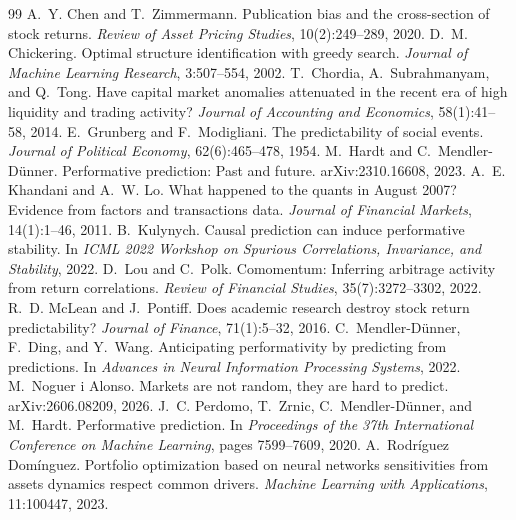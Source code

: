 \documentclass[11pt]{article}
\theoremstyle{plain}
\theoremstyle{definition}
\begin{document}
\begin{thebibliography}{99}
 A.~Y. Chen and T.~Zimmermann. Publication bias and the cross-section of stock returns. \emph{Review of Asset Pricing Studies}, 10(2):249--289, 2020.
 D.~M. Chickering. Optimal structure identification with greedy search. \emph{Journal of Machine Learning Research}, 3:507--554, 2002.
 T.~Chordia, A.~Subrahmanyam, and Q.~Tong. Have capital market anomalies attenuated in the recent era of high liquidity and trading activity? \emph{Journal of Accounting and Economics}, 58(1):41--58, 2014.
 E.~Grunberg and F.~Modigliani. The predictability of social events. \emph{Journal of Political Economy}, 62(6):465--478, 1954.
 M.~Hardt and C.~Mendler-D\"unner. Performative prediction: Past and future. arXiv:2310.16608, 2023.
 A.~E. Khandani and A.~W. Lo. What happened to the quants in August 2007? Evidence from factors and transactions data. \emph{Journal of Financial Markets}, 14(1):1--46, 2011.
 B.~Kulynych. Causal prediction can induce performative stability. In \emph{ICML 2022 Workshop on Spurious Correlations, Invariance, and Stability}, 2022.
 D.~Lou and C.~Polk. Comomentum: Inferring arbitrage activity from return correlations. \emph{Review of Financial Studies}, 35(7):3272--3302, 2022.
 R.~D. McLean and J.~Pontiff. Does academic research destroy stock return predictability? \emph{Journal of Finance}, 71(1):5--32, 2016.
 C.~Mendler-D\"unner, F.~Ding, and Y.~Wang. Anticipating performativity by predicting from predictions. In \emph{Advances in Neural Information Processing Systems}, 2022.
 M.~Noguer i Alonso. Markets are not random, they are hard to predict. arXiv:2606.08209, 2026.
 J.~C. Perdomo, T.~Zrnic, C.~Mendler-D\"unner, and M.~Hardt. Performative prediction. In \emph{Proceedings of the 37th International Conference on Machine Learning}, pages 7599--7609, 2020.
 A.~Rodr\'iguez Dom\'inguez. Portfolio optimization based on neural networks sensitivities from assets dynamics respect common drivers. \emph{Machine Learning with Applications}, 11:100447, 2023.

\end{thebibliography}
\end{document}
